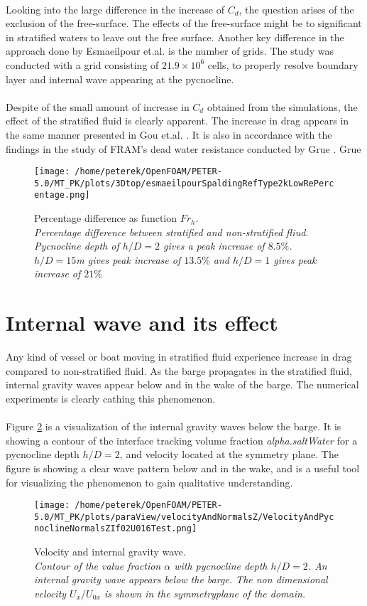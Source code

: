 \documentclass[a4paper, 12pt]{report}
\begin{document}
\\
Looking into the large difference in the increase of $C_d$, the question arises of the exclusion of the free-surface. The effects of the free-surface might be to significant in stratified waters to leave out the free surface. Another key difference in the approach done by Esmaeilpour et.al. is the number of grids. The study was conducted with a grid consisting of $21.9\times 10^6$ cells, to properly resolve boundary layer and internal wave appearing at the pycnocline.\\
\\
Despite of the small amount of increase in $C_d$ obtained from the simulations, the effect of the stratified fluid is clearly apparent. The increase in drag appears in the same manner presented in Gou et.al. \cite{Gou}. It is also in accordance with the findings in the study of FRAM's dead water resistance conducted by Grue \cite{Grue}. Grue 
\begin{figure}[H]
	\centering
	\texttt{[image: /home/peterek/OpenFOAM/PETER-5.0/MT\_PK/plots/3Dtop/esmaeilpourSpaldingRefType2kLowRePercentage.png]}
	\caption{Percentage difference as function $Fr_h$.  \\ \textit{Percentage difference between stratified and non-stratified fliud. Pycnocline depth of  $h/D=2$ gives a peak increase of $8.5\%$. $h/D=15$m gives peak increase of $13.5\%$ and $h/D=1$ gives peak increase of $21\%$}}
	\label{fig:CdPercentageDifference}
\end{figure}
\section{Internal wave and its effect}
Any kind of vessel or boat moving in stratified fluid experience increase in drag compared to non-stratified fluid. As the barge propagates in the stratified fluid, internal gravity waves appear below and in the wake of the barge. The numerical experiments is clearly cathing this phenomenon.\\
\\
Figure \ref{fig:velocityAndPycnoclineIf02U016Test} is a visualization of the internal gravity waves below the barge. It is showing a contour of the interface tracking volume fraction \textit{alpha.saltWater} for a pycnocline depth $h/D=2$, and velocity located at the symmetry plane. The figure is showing a clear wave pattern below and in the wake, and is a useful tool for visualizing the phenomenon to gain qualitative understanding. 
\begin{figure}[H]
	\centering
	\texttt{[image: /home/peterek/OpenFOAM/PETER-5.0/MT\_PK/plots/paraView/velocityAndNormalsZ/VelocityAndPycnoclineNormalsZIf02U016Test.png]}
	\caption{Velocity and internal gravity wave. \\ \textit{Contour of the value fraction $\alpha$ with pycnocline depth $h/D=2$. An internal gravity wave appears below the barge. The non dimensional velocity $U_x/U_{0x}$ is shown in the symmetryplane of the domain.}}
	\label{fig:velocityAndPycnoclineIf02U016Test}
\end{figure}
\end{document}
